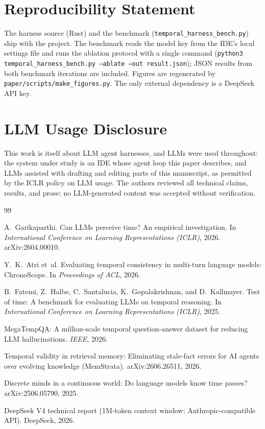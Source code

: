 \documentclass[10pt]{article}
\begin{document}
\section*{Reproducibility Statement}
The harness source (Rust) and the benchmark (\texttt{temporal\_harness\_bench.py})
ship with the project. The benchmark reads the model key from the IDE's local
settings file and runs the ablation protocol with a single command
(\texttt{python3 temporal\_harness\_bench.py --ablate --out result.json}); JSON
results from both benchmark iterations are included. Figures are regenerated by
\texttt{paper/scripts/make\_figures.py}. The only external dependency is a DeepSeek
API key.

\section*{LLM Usage Disclosure}
This work is itself about LLM agent harnesses, and LLMs were used throughout: the
system under study is an IDE whose agent loop this paper describes, and LLMs
assisted with drafting and editing parts of this manuscript, as permitted by the
ICLR policy on LLM usage. The authors reviewed all technical claims, results, and
prose; no LLM-generated content was accepted without verification.

{\small
\begin{thebibliography}{99}

A.~Garikaparthi.
Can LLMs perceive time? An empirical investigation.
In \emph{International Conference on Learning Representations (ICLR)}, 2026.
arXiv:2604.00010.

Y.~K.~Atri et~al.
Evaluating temporal consistency in multi-turn language models: ChronoScope.
In \emph{Proceedings of ACL}, 2026.

B.~Fatemi, Z.~Halbe, C.~Santalucia, K.~Gopalakrishnan, and D.~Kallmayer.
Test of time: A benchmark for evaluating LLMs on temporal reasoning.
In \emph{International Conference on Learning Representations (ICLR)}, 2025.

MegaTempQA: A million-scale temporal question-answer dataset for reducing LLM hallucinations.
\emph{IEEE}, 2026.

Temporal validity in retrieval memory: Eliminating stale-fact errors for AI agents
over evolving knowledge (MemStrata).
arXiv:2606.26511, 2026.

Discrete minds in a continuous world: Do language models know time passes?
arXiv:2506.05790, 2025.

DeepSeek V4 technical report (1M-token context window; Anthropic-compatible API).
DeepSeek, 2026.

\end{thebibliography}
}
\end{document}
